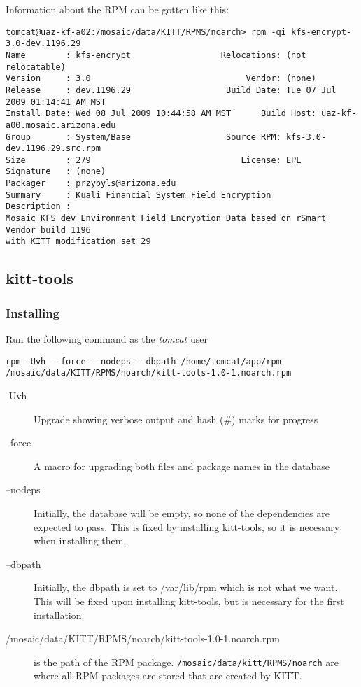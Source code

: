 \documentclass[12pt,notitlepage]{article}
\begin{document}
Information about the RPM can be gotten like this:

\begin{lstlisting}
tomcat@uaz-kf-a02:/mosaic/data/KITT/RPMS/noarch> rpm -qi kfs-encrypt-3.0-dev.1196.29
Name        : kfs-encrypt                  Relocations: (not relocatable)
Version     : 3.0                               Vendor: (none)
Release     : dev.1196.29                   Build Date: Tue 07 Jul 2009 01:14:41 AM MST
Install Date: Wed 08 Jul 2009 10:44:58 AM MST      Build Host: uaz-kf-a00.mosaic.arizona.edu
Group       : System/Base                   Source RPM: kfs-3.0-dev.1196.29.src.rpm
Size        : 279                              License: EPL
Signature   : (none)
Packager    : przybyls@arizona.edu
Summary     : Kuali Financial System Field Encryption
Description :
Mosaic KFS dev Environment Field Encryption Data based on rSmart Vendor build 1196
with KITT modification set 29
\end{lstlisting}

\subsection{kitt-tools}
\subsubsection{Installing}
Run the following command as the \emph{tomcat} user

\lstset{basicstyle=\small,
  breaklines=true,
  includerangemarker=false}
\begin{lstlisting}
rpm -Uvh --force --nodeps --dbpath /home/tomcat/app/rpm /mosaic/data/KITT/RPMS/noarch/kitt-tools-1.0-1.noarch.rpm 
\end{lstlisting}

\begin{description}
  \item[-Uvh] Upgrade showing verbose output and hash (\#) marks for progress
  \item[--force] A macro for upgrading both files and package names in the database
  \item[--nodeps] Initially, the database will be empty, so none of the dependencies are expected to pass. This
    is fixed by installing kitt-tools, so it is necessary when installing them.
  \item[--dbpath] Initially, the dbpath is set to /var/lib/rpm which is not what we want. This will be
    fixed upon installing kitt-tools, but is necessary for the first installation.
  \item[/mosaic/data/KITT/RPMS/noarch/kitt-tools-1.0-1.noarch.rpm] is the path of the RPM package. 
    \verb|/mosaic/data/kitt/RPMS/noarch| are where all RPM packages are stored that are created by
    KITT.
\end{description}
\end{document}
